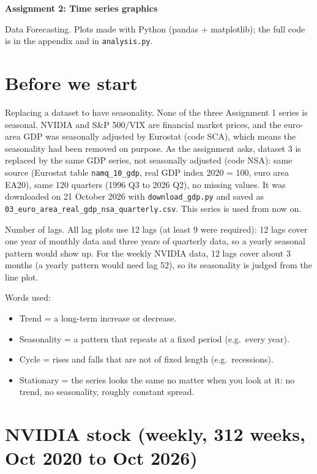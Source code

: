 \documentclass[11pt,a4paper]{article}
\begin{document}
{\Large\bfseries Assignment 2: Time series graphics}\par
{\small Data Forecasting. Plots made with Python (pandas + matplotlib); the full code is in the appendix and in \texttt{analysis.py}.}

\section*{Before we start}

Replacing a dataset to have seasonality.
None of the three Assignment 1 series is seasonal. NVIDIA and S\&P 500/VIX are financial market prices,
and the euro-area GDP was seasonally adjusted by Eurostat (code SCA), which means the seasonality had been removed on purpose.
As the assignment asks, dataset 3 is replaced by the same GDP series, not seasonally adjusted (code NSA):
same source (Eurostat table \texttt{namq\_10\_gdp}, real GDP index 2020 = 100, euro area EA20), same 120 quarters (1996 Q3 to 2026 Q2), no missing values.
It was downloaded on 21 October 2026 with \texttt{download\_gdp.py} and saved as \texttt{03\_euro\_area\_real\_gdp\_nsa\_quarterly.csv}.
This series is used from now on.

Number of lags. All lag plots use 12 lags (at least 9 were required): 12 lags cover one year of monthly data and three years of quarterly data,
so a yearly seasonal pattern would show up. For the weekly NVIDIA data, 12 lags cover about 3 months (a yearly pattern would need lag 52),
so its seasonality is judged from the line plot.

Words used:
\begin{itemize}
  \item Trend = a long-term increase or decrease.
  \item Seasonality = a pattern that repeats at a fixed period (e.g.\ every year).
  \item Cycle = rises and falls that are not of fixed length (e.g.\ recessions).
  \item Stationary = the series looks the same no matter when you look at it: no trend, no seasonality, roughly constant spread.
\end{itemize}

\newpage
\section{NVIDIA stock (weekly, 312 weeks, Oct 2020 to Oct 2026)}
\end{document}

